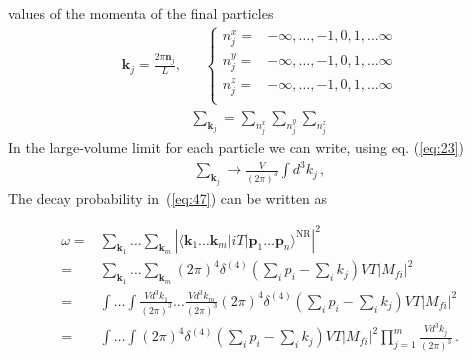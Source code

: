 values of the momenta of the final particles
\begin{align}
  \mathbf{k}_j=\frac{2\pi\mathbf{n}_j}{L},& &
  \begin{cases}
   n_j^x=& -\infty,\ldots,-1,0,1,\ldots\infty\\
   n_j^y=& -\infty,\ldots,-1,0,1,\ldots\infty\\
   n_j^z=& -\infty,\ldots,-1,0,1,\ldots\infty\\
  \end{cases}
\end{align}
\begin{align}
  \sum_{\mathbf{k}_j}=\sum_{n_j^x}\sum_{n_j^y}\sum_{n_j^z}
\end{align}
In the large-volume limit
for each particle we can write, using eq. (\ref{eq:23})
\begin{align}
  \sum_{\mathbf{k}_j}
\to \frac{V}{(2\pi)^3}  \int d^3k_j\,,
\end{align}
The decay probability in~(\ref{eq:47}) can be written as

\begin{align}
  \label{eq:48}
\omega=&\sum_{\mathbf{k}_1}\ldots\sum_{\mathbf{k}_m}\left|
           \langle\mathbf{k}_1\ldots\mathbf{k}_m|i T|\mathbf{p}_1\ldots\mathbf{p}_n\rangle^{\text{NR}}\right|^2\nonumber\\
  =&\sum_{\mathbf{k}_1}\ldots\sum_{\mathbf{k}_m}(2\pi)^4\delta^{(4)}\left(\sum_i p_i-\sum_i k_j\right)V T  
  \left|{M}_{fi}\right|^2\nonumber\\
  =&\int\ldots\int \frac{Vd^3k_1}{(2\pi)^3}\ldots\frac{Vd^3k_m}{(2\pi)^3} 
(2\pi)^4\delta^{(4)}\left(\sum_i p_i-\sum_i k_j\right)V T \left|{M}_{fi}\right|^2\nonumber\\
=&\int\ldots\int 
(2\pi)^4\delta^{(4)}\left(\sum_i p_i-\sum_i k_j\right)V T \left|{M}_{fi}\right|^2
 \prod_{j=1}^m\frac{Vd^3k_j}{(2\pi)^3}\,.
\end{align}


